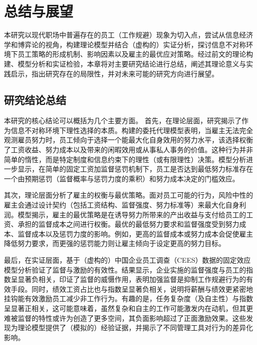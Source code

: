 \chapter{总结与展望}
\label{chap:conclusion}

本研究以现代职场中普遍存在的员工（工作规避）现象为切入点，尝试从信息经济学和博弈论的视角，构建理论模型并结合（虚构的）实证分析，探讨信息不对称环境下员工策略的形成机制、影响因素以及雇主的最优应对策略。经过前文的理论构建、模型分析和实证检验，本章将对主要研究结论进行总结，阐述其理论意义与实践启示，指出研究存在的局限性，并对未来可能的研究方向进行展望。

\section{研究结论总结}

本研究的核心结论可以概括为几个主要方面。
首先，在理论层面，研究揭示了作为信息不对称环境下理性选择的本质。构建的委托代理模型表明，当雇主无法完全观测雇员努力时，员工倾向于选择一个能最大化自身效用的努力水平，该选择权衡了工资收益、努力成本以及带来的闲暇效用或从事私人事务的价值。这种行为并非简单的惰性，而是特定制度和信息约束下的理性（或有限理性）决策。模型分析进一步显示，在简单的固定工资加监督惩罚机制下，员工是否达到最低努力标准存在一个由预期惩罚（监督概率与惩罚力度的乘积）和努力成本决定的门槛效应。

其次，理论层面分析了雇主的权衡与最优策略。面对员工可能的行为，风险中性的雇主会通过设计契约（包括工资结构、监督强度、努力标准等）来最大化自身利润。模型揭示，雇主的最优策略是在诱导努力所带来的产出收益与支付给员工的工资、承担的监督成本之间进行权衡。最优的最低努力要求和监督强度受到努力成本、监督成本以及惩罚力度的影响。例如，更高的监督成本或努力成本会促使雇主降低努力要求，而更强的惩罚能力则让雇主倾向于设定更高的努力目标。

最后，在实证层面，基于（虚构的）中国企业员工调查（CEES）数据的固定效应模型分析验证了监督与激励的有效性。结果显示，企业实施的监督强度与员工的指数呈显著负相关，印证了监督的威慑作用，表明加强监督是抑制工作规避行为的有效手段。同时，绩效工资占比也与指数呈显著负相关，说明将薪酬与绩效更紧密地挂钩能有效激励员工减少非工作行为。有趣的是，任务复杂度（及自主性）与指数呈显著正相关，这可能意味着，虽然复杂和自主的工作可能激发内在动机，但其更难被监督的特性或许为创造了更多空间，其负面影响超过了正面激励效果。这些发现为理论模型提供了（模拟的）经验证据，并揭示了不同管理工具对行为的差异化影响。

